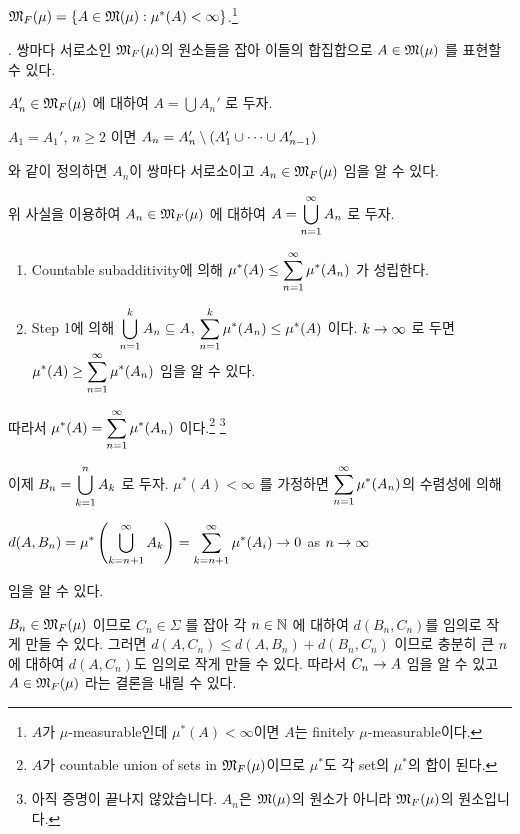  \textit{\(\mathfrak{M}_F(\mu) = \{A \in \mathfrak{M}(\mu) : \mu^\ast(A) < \infty\}\).}\footnote{\(A\)가 \(\mu\)-measurable인데 \(\mu^\ast(A) < \infty\)이면 \(A\)는 finitely \(\mu\)-measurable이다.}

\quad \claim. 쌍마다 서로소인 \(\mathfrak{M}_F(\mu)\)의 원소들을 잡아 이들의 합집합으로 \(A \in \mathfrak{M}(\mu)\) 를 표현할 수 있다.

\quad \pf \(A_n' \in \mathfrak{M}_F(\mu)\) 에 대하여 \(A = \bigcup A_n'\) 로 두자.
\begin{center}
    \(A_1 = A_1'\), \(n \geq 2\) 이면 \(A_n = A_n' \setminus (A_1'\cup \cdots \cup A_{n-1}')\)
\end{center}
와 같이 정의하면 \(A_n\)이 쌍마다 서로소이고 \(A_n \in \mathfrak{M}_F(\mu)\) 임을 알 수 있다.

위 사실을 이용하여 \(A_n \in \mathfrak{M}_F(\mu)\) 에 대하여 \(A = \displaystyle \bigcup_{n=1}^\infty A_n\) 로 두자.
\begin{enumerate}
    \item Countable subadditivity에 의해 \(\displaystyle \mu^\ast(A) \leq \sum_{n=1}^{\infty} \mu^\ast (A_n)\) 가 성립한다.
    \item {\sffamily Step 1}에 의해 \(\displaystyle \bigcup_{n=1}^k A_n \subseteq A\), \(\displaystyle \sum_{n=1}^{k} \mu^\ast(A_n) \leq \mu^\ast(A)\) 이다. \(k \rightarrow \infty\) 로 두면 \(\displaystyle \mu^\ast(A) \geq \sum_{n=1}^\infty \mu^\ast(A_n)\) 임을 알 수 있다.
\end{enumerate}

따라서 \(\displaystyle \mu^\ast(A) = \sum_{n=1}^\infty \mu^\ast(A_n)\) 이다.\footnote{\(A\)가 countable union of sets in \(\mathfrak{M}_F(\mu)\)이므로 \(\mu^\ast\)도 각 set의 \(\mu^\ast\)의 합이 된다.} \footnote{아직 증명이 끝나지 않았습니다. \(A_n\)은 \(\mathfrak{M}(\mu)\)의 원소가 아니라 \(\mathfrak{M}_F(\mu)\)의 원소입니다.}

이제 \(B_n =\displaystyle \bigcup_{k=1}^n A_k\) 로 두자. \(\mu^\ast(A) < \infty\) 를 가정하면 \(\displaystyle \sum_{n=1}^\infty \mu^\ast(A_n)\)의 수렴성에 의해
\begin{center}
    \(\displaystyle d(A, B_n) = \mu^\ast\left( \bigcup_{k=n+1}^\infty A_k \right) = \sum_{k=n+1}^{\infty} \mu^\ast(A_i) \rightarrow 0\) as \(n \rightarrow \infty\)
\end{center}
임을 알 수 있다.

\(B_n \in \mathfrak{M}_F(\mu)\) 이므로 \(C_n \in \Sigma\) 를 잡아 각 \(n \in \mathbb{N}\) 에 대하여 \(d(B_n, C_n)\)를 임의로 작게 만들 수 있다. 그러면 \(d(A, C_n) \leq d(A, B_n) + d(B_n, C_n)\) 이므로 충분히 큰 \(n\)에 대하여 \(d(A, C_n)\)도 임의로 작게 만들 수 있다. 따라서 \(C_n \rightarrow A\) 임을 알 수 있고 \(A \in \mathfrak{M}_F(\mu)\) 라는 결론을 내릴 수 있다.

